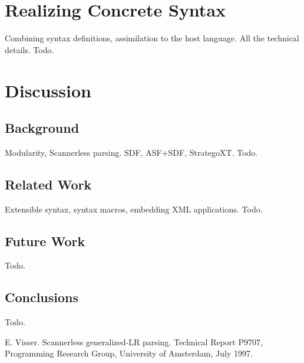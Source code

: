 \documentclass[a4paper,11pt]{article}
\begin{document}
\section{Realizing Concrete Syntax}

Combining syntax definitions, assimilation to the host language.
All the technical details.
Todo.


\section{Discussion}


\subsection{Background}

Modularity, Scannerless parsing.
SDF, ASF+SDF, StrategoXT.
Todo.


\subsection{Related Work}

Extensible syntax, syntax macros, embedding XML applications.
Todo.


\subsection{Future Work}

Todo.


\subsection{Conclusions}

Todo.


\begin{thebibliography}{99}

E. Visser. Scannerless generalized-LR parsing.
Technical Report P9707, Programming Research Group, University of Amsterdam, July 1997.

\end{thebibliography}
\end{document}
